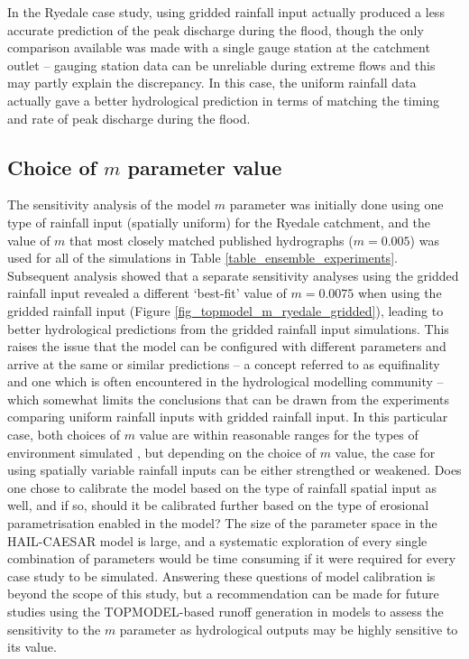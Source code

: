 In the Ryedale case study, using gridded rainfall input actually produced a less accurate prediction of the peak discharge during the flood, though the only comparison available was made with a single gauge station at the catchment outlet -- gauging station data can be unreliable during extreme flows and this may partly explain the discrepancy. In this case, the uniform rainfall data actually gave a better hydrological prediction in terms of matching the timing and rate of peak discharge during the flood. 

\subsection{Choice of \(m\) parameter value}
The sensitivity analysis of the model \(m\) parameter was initially done using one type of rainfall input (spatially uniform) for the Ryedale catchment, and the value of \(m\) that most closely matched published hydrographs (\(m = 0.005\)) was used for all of the simulations in Table \ref{table_ensemble_experiments}. Subsequent analysis showed that a separate sensitivity analyses using the gridded rainfall input revealed a different `best-fit' value of \(m=0.0075\) when using the gridded rainfall input (Figure \ref{fig_topmodel_m_ryedale_gridded}), leading to better hydrological predictions from the gridded rainfall input simulations. This raises the issue that the model can be configured with different parameters and arrive at the same or similar predictions -- a concept referred to as equifinality and one which is often encountered in the hydrological modelling community \citep{beven1993prophecy,beven2001equifinality,ebel2006physics} -- which somewhat limits the conclusions that can be drawn from the experiments comparing uniform rainfall inputs with gridded rainfall input. In this particular case, both choices of \(m\) value are within reasonable ranges for the types of environment simulated \citep{beven1984testing}, but depending on the choice of \(m\) value, the case for using spatially variable rainfall inputs can be either strengthed or weakened. Does one chose to calibrate the model based on the type of rainfall spatial input as well, and if so, should it be calibrated further based on the type of erosional parametrisation enabled in the model? The size of the parameter space in the HAIL-CAESAR model is large, and a systematic exploration of every single combination of parameters would be time consuming if it were required for every case study to be simulated. Answering these questions of model calibration is beyond the scope of this study, but a recommendation can be made for future studies using the TOPMODEL-based runoff generation in models to assess the sensitivity to the \(m\) parameter as hydrological outputs may be highly sensitive to its value.

